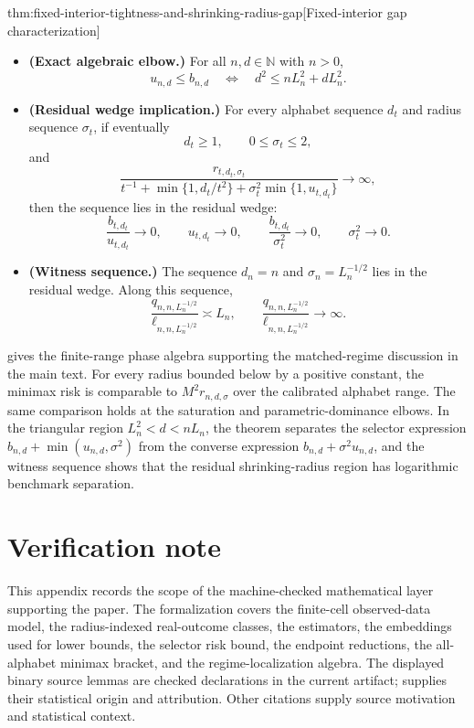 \documentclass[11pt]{article}
\begin{document}
\begin{theoremv}{thm:fixed-interior-tightness-and-shrinking-radius-gap}[Fixed-interior gap characterization]
\begin{itemize}
\item \textbf{(Exact algebraic elbow.)}  For all \(n,d\in\mathbb N\) with \(n>0\),
\[
u_{n,d}\le b_{n,d}
\quad\Longleftrightarrow\quad
d^2\le nL_n^2+dL_n^2.
\]

\item \textbf{(Residual wedge implication.)}  For every alphabet sequence \(d_t\) and radius sequence \(\sigma_t\), if eventually
\[
d_t\ge1,\qquad 0\le\sigma_t\le2,
\]
and
\[
\frac{r_{t,d_t,\sigma_t}}{t^{-1}+\min\{1,d_t/t^2\}+\sigma_t^2\min\{1,u_{t,d_t}\}}\longrightarrow\infty,
\]
then the sequence lies in the residual wedge:
\[
\frac{b_{t,d_t}}{u_{t,d_t}}\longrightarrow0,\qquad
u_{t,d_t}\longrightarrow0,\qquad
\frac{b_{t,d_t}}{\sigma_t^2}\longrightarrow0,\qquad
\sigma_t^2\longrightarrow0.
\]

\item \textbf{(Witness sequence.)}  The sequence \(d_n=n\) and \(\sigma_n=L_n^{-1/2}\) lies in the residual wedge.  Along this sequence,
\[
\frac{q_{n,n,L_n^{-1/2}}}{\ell_{n,n,L_n^{-1/2}}}
\asymp L_n,
\qquad
\frac{q_{n,n,L_n^{-1/2}}}{\ell_{n,n,L_n^{-1/2}}}\longrightarrow\infty .
\]
\end{itemize}
\end{theoremv}

 gives the finite-range phase algebra supporting the matched-regime discussion in the main text. For every radius bounded below by a positive constant, the minimax risk is comparable to \(M^2r_{n,d,\sigma}\) over the calibrated alphabet range. The same comparison holds at the saturation and parametric-dominance elbows. In the triangular region \(L_n^2<d<nL_n\), the theorem separates the selector expression \(b_{n,d}+\min(u_{n,d},\sigma^2)\) from the converse expression \(b_{n,d}+\sigma^2u_{n,d}\), and the witness sequence shows that the residual shrinking-radius region has logarithmic benchmark separation.


\section{Verification note}

This appendix records the scope of the machine-checked mathematical layer supporting the paper. The formalization covers the finite-cell observed-data model, the radius-indexed real-outcome classes, the estimators, the embeddings used for lower bounds, the selector risk bound, the endpoint reductions, the all-alphabet minimax bracket, and the regime-localization algebra. The displayed binary source lemmas are checked declarations in the current artifact; \citet{ZengBalakrishnanHanKennedy2024} supplies their statistical origin and attribution. Other citations supply source motivation and statistical context.
\end{document}
